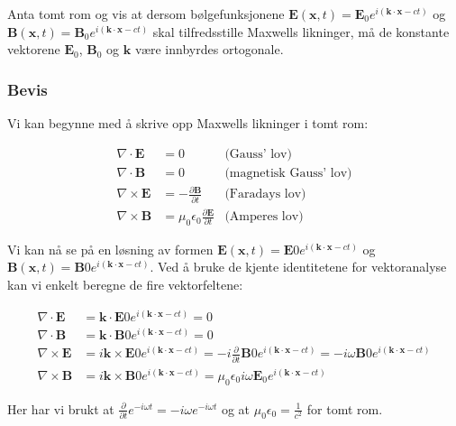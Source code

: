 \homeworkProblem[3]
Anta tomt rom og vis at dersom bølgefunksjonene $\mathbf{E}(\mathbf{x}, t)=\mathbf{E}_{0} e^{i(\mathbf{k} \cdot \mathbf{x}-c t)}$ og $\mathbf{B}(\mathbf{x}, t)=\mathbf{B}_{0} e^{i(\mathbf{k} \cdot \mathbf{x}-c t)}$ skal tilfredsstille Maxwells likninger, må de konstante vektorene $ \mathbf{E}_{0}$, $\mathbf{B}_{0} $ og $ \mathbf{k} $ være innbyrdes ortogonale.

\subsubsection*{Bevis}


Vi kan begynne med å skrive opp Maxwells likninger i tomt rom:

\begin{align*}
\nabla \cdot \mathbf{E} &= 0 & \text{(Gauss' lov)} \\
\nabla \cdot \mathbf{B} &= 0 & \text{(magnetisk Gauss' lov)} \\
\nabla \times \mathbf{E} &= -\frac{\partial \mathbf{B}}{\partial t} & \text{(Faradays lov)} \\
\nabla \times \mathbf{B} &= \mu_0 \epsilon_0 \frac{\partial \mathbf{E}}{\partial t} & \text{(Amperes lov)}
\end{align*}

Vi kan nå se på en løsning av formen $\mathbf{E}(\mathbf{x}, t)=\mathbf{E}{0} e^{i(\mathbf{k} \cdot \mathbf{x}-c t)}$ og $\mathbf{B}(\mathbf{x}, t)=\mathbf{B}{0} e^{i(\mathbf{k} \cdot \mathbf{x}-c t)}$. Ved å bruke de kjente identitetene for vektoranalyse kan vi enkelt beregne de fire vektorfeltene:

\begin{align*}
\nabla \cdot \mathbf{E} &= \mathbf{k} \cdot \mathbf{E}{0} e^{i(\mathbf{k} \cdot \mathbf{x}-c t)} = 0 \\
\nabla \cdot \mathbf{B} &= \mathbf{k} \cdot \mathbf{B}{0} e^{i(\mathbf{k} \cdot \mathbf{x}-c t)} = 0 \\
\nabla \times \mathbf{E} &= i\mathbf{k} \times \mathbf{E}{0} e^{i(\mathbf{k} \cdot \mathbf{x}-c t)} = -i\frac{\partial}{\partial t} \mathbf{B}{0} e^{i(\mathbf{k} \cdot \mathbf{x}-c t)} = -i\omega \mathbf{B}{0} e^{i(\mathbf{k} \cdot \mathbf{x}-c t)} \\
\nabla \times \mathbf{B} &= i\mathbf{k} \times \mathbf{B}{0} e^{i(\mathbf{k} \cdot \mathbf{x}-c t)} = \mu_0 \epsilon_0 i\omega \mathbf{E}_{0} e^{i(\mathbf{k} \cdot \mathbf{x}-c t)}
\end{align*}

Her har vi brukt at $\frac{\partial}{\partial t} e^{-i\omega t} = -i\omega e^{-i\omega t}$ og at $\mu_0 \epsilon_0 = \frac{1}{c^2}$ for tomt rom.

